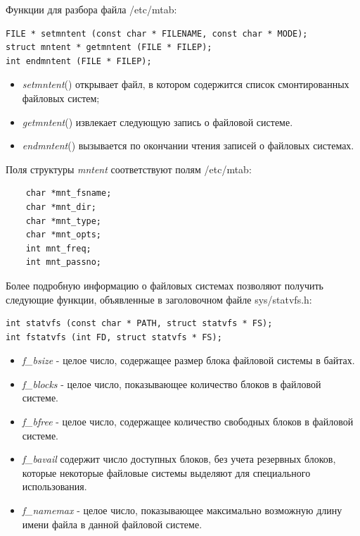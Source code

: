 \documentclass[xcolor=table]{beamer}
\begin{document}
\begin{frame}[fragile]
	\begin{block}{Функции для разбора файла /etc/mtab:}
		\begin{verbatim}
FILE * setmntent (const char * FILENAME, const char * MODE);
struct mntent * getmntent (FILE * FILEP);
int endmntent (FILE * FILEP);
		\end{verbatim} 
	\end{block}	
	\begin{itemize}
		\item \textit{setmntent}() открывает файл, в котором содержится список смонтированных файловых систем;
		\item \textit{getmntent}() извлекает следующую запись о файловой системе. 
		\item \textit{endmntent}() вызывается по окончании чтения записей о файловых системах.
	\end{itemize}
	Поля структуры \textit{mntent} соответствуют полям /etc/mtab:
	\begin{verbatim}
	char *mnt_fsname;
	char *mnt_dir;
	char *mnt_type;
	char *mnt_opts;
	int mnt_freq;
	int mnt_passno;
	\end{verbatim}
\end{frame}

\begin{frame}[fragile]
	Более подробную информацию о файловых системах позволяют получить следующие функции, объявленные в заголовочном файле sys/statvfs.h:
	\begin{verbatim}
int statvfs (const char * PATH, struct statvfs * FS);
int fstatvfs (int FD, struct statvfs * FS);
	\end{verbatim}
	\begin{itemize}
		\item \textit{f\_bsize} - целое число, содержащее размер блока файловой системы в байтах.
		\item \textit{f\_blocks} - целое число, показывающее количество блоков в файловой системе.
		\item \textit{f\_bfree} - целое число, содержащее количество свободных блоков в файловой системе.
		\item \textit{f\_bavail} содержит число доступных блоков, без учета резервных блоков, которые некоторые файловые системы выделяют для специального использования.
		\item \textit{f\_namemax} - целое число, показывающее максимально возможную длину имени файла в данной файловой системе. 
	\end{itemize}
\end{frame}
\end{document}
